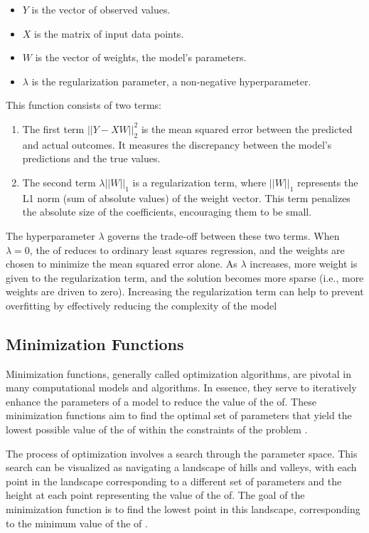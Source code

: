 \documentclass[
  a4paper,  %
  twoside,  %
  bibliography=totoc,
  headsepline,
  cleardoublepage=empty,
  parskip=half,
  draft=false
]{scrbook}
\begin{document}
\begin{itemize}
  \item \(Y\) is the vector of observed values.
  \item \(X\) is the matrix of input data points.
  \item \(W\) is the vector of weights, the model's parameters.
  \item \(\lambda\) is the regularization parameter, a non-negative hyperparameter.
\end{itemize}

This function consists of two terms:
\begin{enumerate}
  \item The first term \(||Y - XW||^2_2\) is the mean squared error between the predicted and actual outcomes.
  It measures the discrepancy between the model's predictions and the true values.
  \item The second term \(\lambda ||W||_1\) is a regularization term, where \(||W||_1\) represents the L1 norm (sum of absolute values) of the weight vector.
  This term penalizes the absolute size of the coefficients, encouraging them to be small.
\end{enumerate}
The hyperparameter \(\lambda\) governs the trade-off between these two terms.
When \(\lambda = 0\), the \gls{of} reduces to ordinary least squares regression, and the weights are chosen to minimize the mean squared error alone.
As \(\lambda\) increases, more weight is given to the regularization term, and the solution becomes more sparse (i.e., more weights are driven to zero).
Increasing the regularization term can help to prevent overfitting by effectively reducing the complexity of the model \cite{ShalevShwartz2014}

\subsection{Minimization Functions}
\label{subsec:minimizationFunctions}
Minimization functions, generally called optimization algorithms, are pivotal in many computational models and algorithms.
In essence, they serve to iteratively enhance the parameters of a model to reduce the value of the \gls{of}.
These minimization functions aim to find the optimal set of parameters that yield the lowest possible value of the \gls{of} within the constraints of the problem \cite{Nocedal2006}.

The process of optimization involves a search through the parameter space.
This search can be visualized as navigating a landscape of hills and valleys, with each point in the landscape corresponding to a different set of parameters and the height at each point representing the value of the \gls{of}.
The goal of the minimization function is to find the lowest point in this landscape, corresponding to the minimum value of the \gls{of} \cite{Goodfellow2017}.
\end{document}
